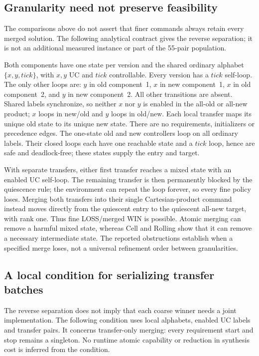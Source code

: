 \subsection{Granularity need not preserve feasibility}\label{ta:granularity-reverse}
The comparisons above do not assert that finer commands always retain every merged solution. The following analytical contract gives the reverse separation; it is not an additional measured instance or part of the 55-pair population.

Both components have one state per version and the shared ordinary alphabet $\{x,y,tick\}$, with $x,y$ UC and $tick$ controllable. Every version has a $tick$ self-loop. The only other loops are: $y$ in old component~1, $x$ in new component~1, $x$ in old component~2, and $y$ in new component~2. All other transitions are absent. Shared labels synchronize, so neither $x$ nor $y$ is enabled in the all-old or all-new product; $x$ loops in new/old and $y$ loops in old/new. Each local transfer maps its unique old state to its unique new state. There are no requirements, initializers or precedence edges. The one-state old and new controllers loop on all ordinary labels. Their closed loops each have one reachable state and a $tick$ loop, hence are safe and deadlock-free; these states supply the entry and target.

With separate transfers, either first transfer reaches a mixed state with an enabled UC self-loop. The remaining transfer is then permanently blocked by the quiescence rule; the environment can repeat the loop forever, so every fine policy loses. Merging both transfers into their single Cartesian-product command instead moves directly from the quiescent entry to the quiescent all-new target, with rank one. Thus fine LOSS/merged WIN is possible. Atomic merging can remove a harmful mixed state, whereas Cell and Rolling show that it can remove a necessary intermediate state. The reported obstructions establish when a specified merge loses, not a universal refinement order between granularities.

\subsection{A local condition for serializing transfer batches}\label{ta:serial-transfer}
The reverse separation does not imply that each coarse winner needs a joint implementation. The following condition uses local alphabets, enabled UC labels and transfer pairs. It concerns transfer-only merging: every requirement start and stop remains a singleton. No runtime atomic capability or reduction in synthesis cost is inferred from the condition.

